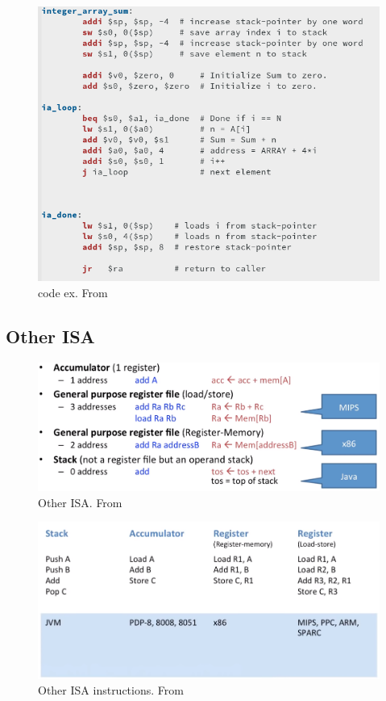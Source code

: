 \begin{figure}[H]
    \centering
    \includegraphics[width=16cm]{image/code-ex.png} 
    \caption{code ex. From \cite{ca}}
\end{figure}


\subsection{Other ISA}
\begin{figure}[H]
    \centering
    \includegraphics[width=16cm]{image/other-isa.png} 
    \caption{Other ISA. From \cite{ca}}
\end{figure}

\begin{figure}[H]
    \centering
    \includegraphics[width=16cm]{image/other-isa-instructions.png} 
    \caption{Other ISA instructions. From \cite{ca}}
\end{figure}



